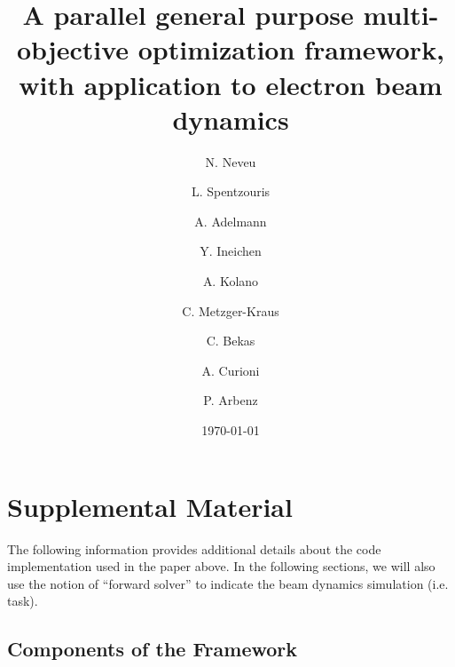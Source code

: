 \documentclass[preprint,linenumbers,amsmath,amssymb,aps,prstab]{revtex4-1}%
\begin{document}
\title{A parallel general purpose multi-objective optimization framework,
  with application to electron beam dynamics}

\author{N. Neveu}

\author{L. Spentzouris}

\author{A. Adelmann}
\author{Y. Ineichen }
\author{A. Kolano}
\author{C. Metzger-Kraus}
%

\author{C. Bekas}
\author{A. Curioni}

%

\author{P. Arbenz}
%

\date{\today}%


\maketitle


\section{Supplemental Material} \label{sec:introduction}

The following information provides additional details about the code implementation
used in the paper above. In the following sections, we will also use the notion of ``forward solver'' to indicate the beam dynamics simulation (i.e. task).

\subsection{Components of the Framework}
\end{document}

